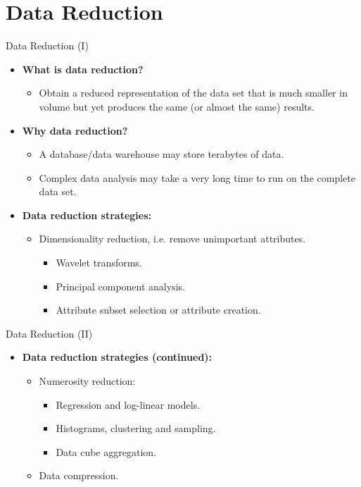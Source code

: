 \section{Data Reduction}

\begin{frame}{Data Reduction (I)}
	\begin{itemize}
		\item \textbf{What is data reduction?}\\
		      \begin{itemize}
			      \item Obtain a reduced representation of the data set that is much
			            smaller in volume but yet produces the same (or almost the same)
			            results.
		      \end{itemize}
		\item \textbf{Why data reduction?}\\
		      \begin{itemize}
			      \item A database/data warehouse may store terabytes of data.
			      \item Complex data analysis may take a very long time to run on the
			            complete data set.
		      \end{itemize}
		\item \textbf{Data reduction strategies:}
		      \begin{itemize}
			      \item Dimensionality reduction, i.e. remove unimportant attributes.
			            \begin{itemize}
				            \item Wavelet transforms.
				            \item Principal component analysis.
				            \item Attribute subset selection or attribute creation.
			            \end{itemize}
		      \end{itemize}
	\end{itemize}
\end{frame}

\begin{frame}{Data Reduction (II)}
	\begin{itemize}
		\item \textbf{Data reduction strategies (continued):}
		      \begin{itemize}
			      \item Numerosity reduction:
			            \begin{itemize}
				            \item Regression and log-linear models.
				            \item Histograms, clustering and sampling.
				            \item Data cube aggregation.
			            \end{itemize}
			      \item Data compression.
		      \end{itemize}
	\end{itemize}
\end{frame}

